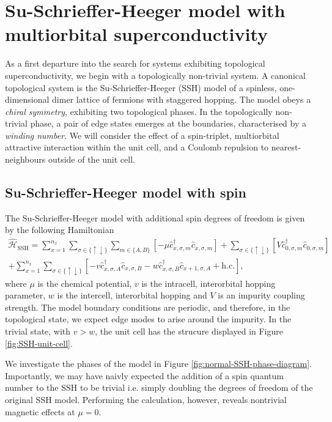 \chapter{\label{ch:SSH}Su-Schrieffer-Heeger model with multiorbital superconductivity}
As a first departure into the search for systems exhibiting topological 
superconductivity, we begin with a topologically non-trivial system.
A canonical topological system is the Su-Schrieffer-Heeger (SSH) model of a 
spinless, one-dimensional dimer lattice of fermions with staggered hopping. 
The model obeys a {\it chiral symmetry}, exhibiting two topological phases. 
In the topologically non-trivial phase, a pair of edge states emerges at 
the boundaries, characterised by a {\it winding number}. 
We will consider the effect of a spin-triplet, multiorbital attractive interaction within the unit cell, and a Coulomb repulsion to nearest-neighbours outside of the unit cell.

\section{\label{sec:SSH} Su-Schrieffer-Heeger model with spin}
The Su-Schrieffer-Heeger model with additional spin degrees of freedom is given by the following Hamiltonian
\begin{multline}
    \hat{\mathcal H}_\text{SSH} =  
    \sum_{x=1}^{n_x} \sum_{\sigma\in\{\uparrow\downarrow\}} \sum_{m\in\{A,B\}} 
    \left[
-\mu \hat c_{x, \sigma, m}^\dagger \hat c_{x, \sigma, m}
\right]
+\sum_{\sigma\in\{\uparrow\downarrow\}} \left[V \hat c_{0, \sigma, m}^\dagger \hat c_{0, \sigma, m}\right]
    \\+
    \sum_{x=1}^{n_x} \sum_{\sigma\in\{\uparrow\downarrow\}}
    \left[
    -v \hat c_{x, \sigma, A}^\dagger \hat c_{x, \sigma, B}
    -w \hat c_{x, \sigma, B}^\dagger \hat c_{x+1, \sigma, A}
    +\text{h.c.}
    \right],
\label{eq:one-dimensional_SSH}
\end{multline}
where $\mu$ is the chemical potential, $v$ is the intracell, interorbital hopping parameter, $w$ is the intercell, interorbital hopping and $V$ is an impurity coupling strength. The model boundary conditions are periodic, and therefore, in the topological state, we expect edge modes to arise around the impurity.
In the trivial state, with $v>w$, the unit cell has the strucure displayed in Figure \ref{fig:SSH-unit-cell}.

We investigate the phases of the model in Figure \ref{fig:normal-SSH-phase-diagram}. Importantly, we may have naivly expected the addition of a spin quantum number to the SSH to be trivial i.e. simply doubling the degrees of freedom of the original SSH model. Performing the calculation, however, reveals nontrivial magnetic effects at $\mu=0$.

